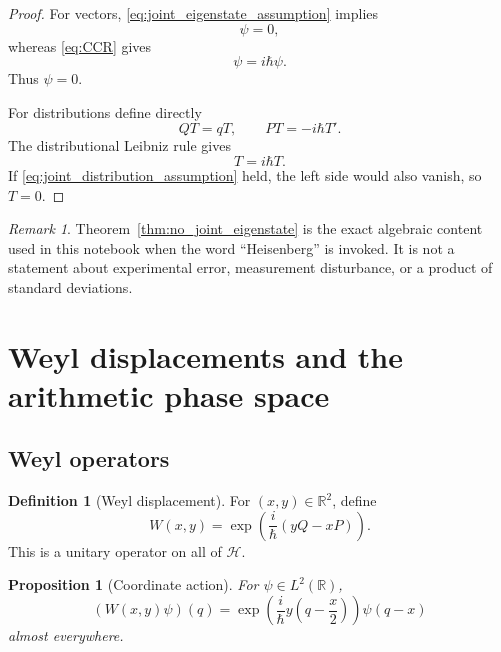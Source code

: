 \documentclass[11pt]{amsart}
\numberwithin{equation}{section}
\theoremstyle{plain}
\newtheorem{proposition}[theorem]{Proposition}
\theoremstyle{definition}
\newtheorem{definition}[theorem]{Definition}
\theoremstyle{remark}
\newtheorem{remark}[theorem]{Remark}
\newcommand{\R}{\mathbb{R}}
\newcommand{\Hil}{\mathcal{H}}
\begin{document}
\begin{proof}
For vectors, \eqref{eq:joint_eigenstate_assumption} implies
\begin{equation}
[Q,P]\psi=0,
\label{eq:joint_eigenstate_commutator_zero}
\end{equation}
whereas \eqref{eq:CCR} gives
\begin{equation}
[Q,P]\psi=i\hbar\psi.
\label{eq:joint_eigenstate_commutator_CCR}
\end{equation}
Thus $\psi=0$.

For distributions define directly
\begin{equation}
QT=qT,
\qquad
PT=-i\hbar T'.
\label{eq:distribution_QP_definition}
\end{equation}
The distributional Leibniz rule gives
\begin{equation}
[Q,P]T=i\hbar T.
\label{eq:distribution_CCR}
\end{equation}
If \eqref{eq:joint_distribution_assumption} held, the left side would also
vanish, so $T=0$.
\end{proof}

\begin{remark}
\label{rem:no_measurement_uncertainty}
Theorem~\ref{thm:no_joint_eigenstate} is the exact algebraic content used in
this notebook when the word ``Heisenberg'' is invoked.  It is not a statement
about experimental error, measurement disturbance, or a product of standard
deviations.
\end{remark}

\section{Weyl displacements and the arithmetic phase space}
\label{sec:weyl_arithmetic}

\subsection{Weyl operators}
\label{subsec:weyl_operators}

\begin{definition}[Weyl displacement]
\label{def:weyl_operator}
For $(x,y)\in\R^2$, define
\begin{equation}
W(x,y)
=
\exp\!\left(\frac{i}{\hbar}(yQ-xP)\right).
\label{eq:weyl_definition}
\end{equation}
This is a unitary operator on all of $\Hil$.
\end{definition}

\begin{proposition}[Coordinate action]
\label{prop:weyl_coordinate_action}
For $\psi\in L^2(\R)$,
\begin{equation}
(W(x,y)\psi)(q)
=
\exp\!\left(\frac{i}{\hbar}y\left(q-\frac{x}{2}\right)\right)
\psi(q-x)
\label{eq:weyl_coordinate_action}
\end{equation}
almost everywhere.
\end{proposition}
\end{document}
